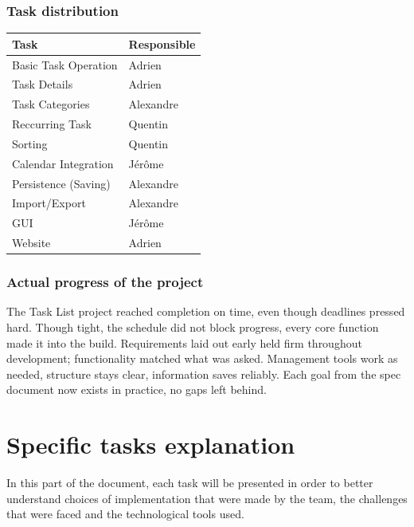 \documentclass{article}
\begin{document}
\subsubsection{Task distribution}
\begin{table}[h!]
    \centering
    \begin{tabular}{|l|l|}
        \hline
        \textbf{Task} & \textbf{Responsible}\\
        \hline
        Basic Task Operation & Adrien\\
        \hline
        Task Details & Adrien\\
        \hline
        Task Categories & Alexandre\\
        \hline
        Reccurring Task & Quentin\\
        \hline
        Sorting & Quentin\\
        \hline
        Calendar Integration & Jérôme\\
        \hline
        Persistence (Saving) & Alexandre\\
        \hline
        Import/Export & Alexandre\\
        \hline
        GUI & Jérôme\\
        \hline
        Website & Adrien\\
        \hline
    \end{tabular}
\end{table}


\subsubsection{Actual progress of the project}
The Task List project reached completion on time, even though deadlines pressed hard. Though tight, the schedule did not block progress, every core function made it into the build. Requirements laid out early held firm throughout development; functionality matched what was asked. Management tools work as needed, structure stays clear, information saves reliably. Each goal from the spec document now exists in practice, no gaps left behind.





\newpage
\section{Specific tasks explanation}
In this part of the document, each task will be presented in order to better understand choices of implementation that were made by the team, the challenges that were faced and the technological tools used. 
\end{document}
